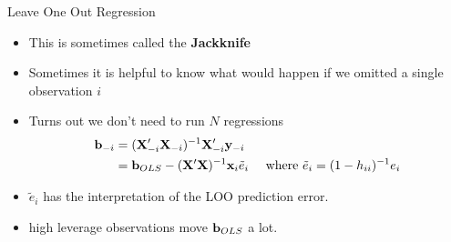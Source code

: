 \begin{frame}{Leave One Out Regression}
\begin{itemize}
\item This is sometimes called the {\bf Jackknife}
\item Sometimes it is helpful to know what would happen if we omitted a single observation $i$
\item Turns out we don't need to run $N$ regressions
\begin{align*}
{\bf b}_{-i} &= ({\bf X}_{-i}'{\bf X}_{-i})^{-1} {\bf X}_{-i}' {\bf y}_{-i} \\
&={\bf b}_{OLS} -  ({\bf X} '{\bf X})^{-1} {\bf x}_i  \tilde{e}_i  \quad \mbox{ where } \tilde{e}_i = (1-h_{ii})^{-1} e_i
\end{align*}
\item $\tilde{e}_i $ has the interpretation of the LOO prediction error.
\item high leverage observations move ${\bf b}_{OLS}$ a lot.
\end{itemize}
\end{frame}





